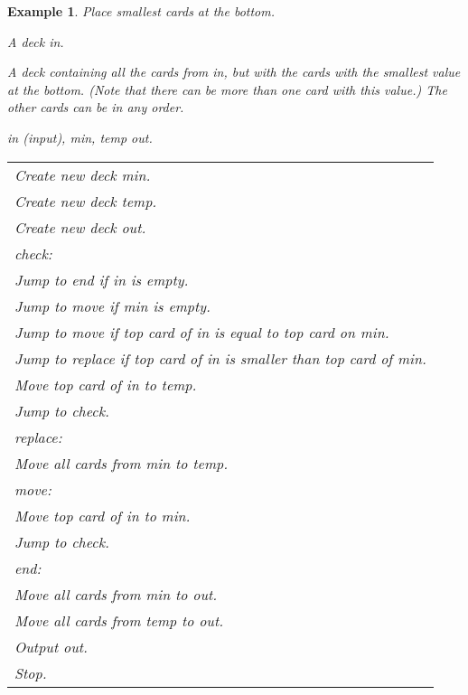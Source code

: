 \documentclass[a4paper,twoside]{tufte-handout}
\newtheorem{example}{Example}
\newcommand\lbl[1]{\hspace{-1em}\emph{#1:}}
\begin{document}
\begin{example}\label{smallbottom}
  Place smallest cards at the bottom.
  \begin{description}
  \item[Input:] A deck \emph{in}.
  \item[Output:] A deck containing all the cards from
    in, but with the cards with the smallest value at the
    bottom. (Note that there can be more than one card with this
    value.) The other cards can be in any order.
  \item[Decks:] \emph{in} (input), \emph{min}, \emph{temp} \emph{out}.
  \item[Algorithm:]
  \item\normalfont
    \begin{tabular}{l}
      Create new deck \emph{min}.\\
      Create new deck \emph{temp}.\\
      Create new deck \emph{out}.\\
      \lbl{check}\\
      Jump to \emph{end} if \emph{in} is empty.\\
      Jump to \emph{move} if \emph{min} is empty.\\
      Jump to \emph{move} if top card of \emph{in} is equal to
      top card on \emph{min}.\\
      Jump to \emph{replace} if top card of \emph{in} is smaller than
      top card of \emph{min}.\\
      Move top card of \emph{in} to \emph{temp}.\\
      Jump to \emph{check}.\\
      \lbl{replace}\\
      Move all cards from \emph{min} to \emph{temp}.\\
      \lbl{move}\\
      Move top card of \emph{in} to \emph{min}.\\
      Jump to \emph{check}.\\
      \lbl{end}\\
      Move all cards from \emph{min} to \emph{out}.\\
      Move all cards from \emph{temp} to \emph{out}.\\
      Output \emph{out}.\\
      Stop.
    \end{tabular}
  \end{description}
\end{example}
\end{document}
